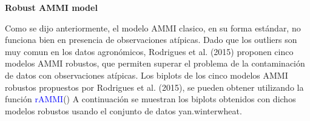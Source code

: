 
\textbf{Robust AMMI model}

Como se dijo anteriormente, el modelo AMMI clasico, en su forma estándar, no funciona bien en presencia de observaciones atípicas. Dado que los outliers son muy comun en los datos agronómicos, Rodrigues et al. (2015) proponen cinco modelos AMMI robustos, que permiten superar el problema de la contaminación de datos con observaciones atípicas. Los biplots de los cinco modelos AMMI robustos propuestos por Rodrigues et al. (2015), se pueden obtener utilizando la función \textcolor{blue}{rAMMI}() A continuación se muestran los biplots obtenidos con dichos modelos robustos usando el conjunto de datos yan.winterwheat.

